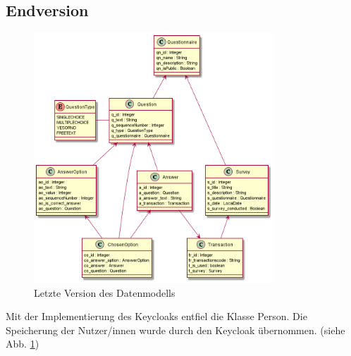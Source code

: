 \subsection{Endversion}
\begin{figure}[H]
    \includegraphics[width=0.8\textwidth]{pics/cld_final.png}
    \centering
    \caption{Letzte Version des Datenmodells}
    \label{fig:cld5}
\end{figure}

Mit der Implementierung des Keycloaks entfiel die Klasse Person. 
Die Speicherung der Nutzer/innen wurde durch den Keycloak übernommen. (siehe Abb. \ref{fig:cld5})
